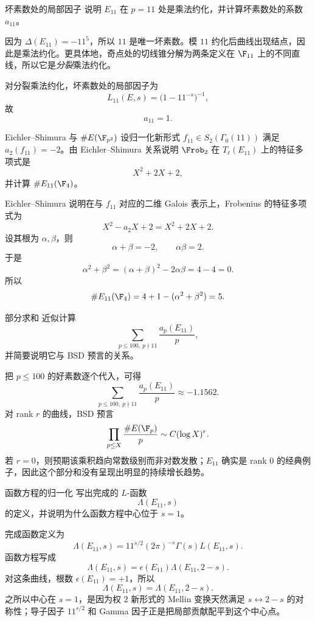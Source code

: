 \begin{problem}{坏素数处的局部因子 \easy}
说明 $E_{11}$ 在 $p=11$ 处是乘法约化，并计算坏素数处的系数 $a_{11}$。
\end{problem}
\begin{solution}
因为 $\Delta(E_{11})=-11^5$，所以 $11$ 是唯一坏素数。模 $11$ 约化后曲线出现结点，因此是乘法约化。更具体地，奇点处的切线锥分解为两条定义在 $\F_{11}$ 上的不同直线，所以它是\emph{分裂}乘法约化。

对分裂乘法约化，坏素数处的局部因子为
\[
L_{11}(E,s)=\bigl(1-11^{-s}\bigr)^{-1},
\]
故
\[
a_{11}=1.
\]
\end{solution}

\begin{problem}{Eichler--Shimura 与 $\#E(\F_{p^2})$ \easy}
设归一化新形式 $f_{11}\in S_2(\Gamma_0(11))$ 满足 $a_2(f_{11})=-2$。由 Eichler--Shimura 关系说明 $\Frob_2$ 在 $T_\ell(E_{11})$ 上的特征多项式是
\[
X^2+2X+2,
\]
并计算 $\#E_{11}(\F_4)$。
\end{problem}
\begin{solution}
Eichler--Shimura 说明在与 $f_{11}$ 对应的二维 Galois 表示上，Frobenius 的特征多项式为
\[
X^2-a_2X+2=X^2+2X+2.
\]
设其根为 $\alpha,\beta$，则
\[
\alpha+\beta=-2,
\qquad
\alpha\beta=2.
\]
于是
\[
\alpha^2+\beta^2=(\alpha+\beta)^2-2\alpha\beta=4-4=0.
\]
所以
\[
\#E_{11}(\F_4)=4+1-(\alpha^2+\beta^2)=5.
\]
\end{solution}

\begin{problem}{部分求和 \easy}
近似计算
\[
\sum_{p\le 100,\ p\nmid 11}\frac{a_p(E_{11})}{p},
\]
并简要说明它与 BSD 预言的关系。
\end{problem}
\begin{solution}
把 $p\le 100$ 的好素数逐个代入，可得
\[
\sum_{p\le 100,\ p\nmid 11}\frac{a_p(E_{11})}{p}
\approx -1.1562.
\]
对 rank $r$ 的曲线，BSD 预言
\[
\prod_{p\le X}\frac{\#E(\F_p)}{p}
\sim C(\log X)^r.
\]
若 $r=0$，则预期该乘积趋向常数级别而非对数发散；$E_{11}$ 确实是 rank $0$ 的经典例子，因此这个部分和没有呈现出明显的持续增长趋势。
\end{solution}

\begin{problem}{函数方程的归一化 \easy}
写出完成的 $L$-函数
\[
\Lambda(E_{11},s)
\]
的定义，并说明为什么函数方程中心位于 $s=1$。
\end{problem}
\begin{solution}
完成函数定义为
\[
\Lambda(E_{11},s)=11^{s/2}(2\pi)^{-s}\Gamma(s)L(E_{11},s).
\]
函数方程写成
\[
\Lambda(E_{11},s)=\epsilon(E_{11})\Lambda(E_{11},2-s).
\]
对这条曲线，根数 $\epsilon(E_{11})=+1$，所以
\[
\Lambda(E_{11},s)=\Lambda(E_{11},2-s).
\]
之所以中心在 $s=1$，是因为权 $2$ 新形式的 Mellin 变换天然满足 $s\leftrightarrow 2-s$ 的对称性；导子因子 $11^{s/2}$ 和 Gamma 因子正是把局部贡献配平到这个中心点。
\end{solution}

